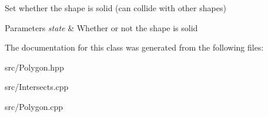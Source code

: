Set whether the shape is solid (can collide with other shapes) 


\begin{DoxyParams}{Parameters}
{\em state} & Whether or not the shape is solid \\
\hline
\end{DoxyParams}


The documentation for this class was generated from the following files\+:\begin{DoxyCompactItemize}
\item 
src/Polygon.\+hpp\item 
src/Intersects.\+cpp\item 
src/Polygon.\+cpp\end{DoxyCompactItemize}
